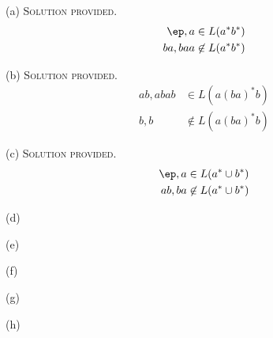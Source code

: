 
(a) \textsc{Solution provided}.
\begin{align*}
  \ep, a   &\in      L(a^*b^*) \\
  ba, baa  &\not\in  L(a^*b^*) 
\end{align*}

(b) \textsc{Solution provided}.
\begin{align*}
  ab, abab   &\in     L(a(ba)^*b) \\
  b, b       &\not\in L(a(ba)^*b) 
\end{align*}

(c) \textsc{Solution provided}.
\begin{align*}
  \ep, a     &\in     L(a^* \cup b^*) \\
  ab, ba     &\not\in L(a^* \cup b^*) 
\end{align*}

(d)

(e)

(f)

(g)

(h)

